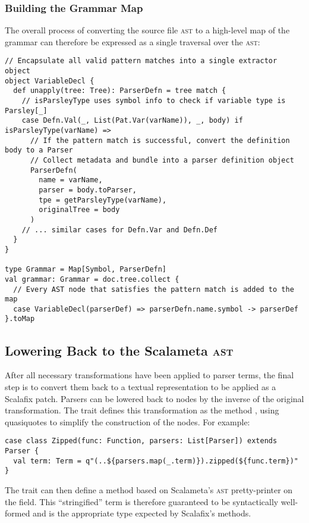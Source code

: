 \documentclass[../../main.tex]{subfiles}
\begin{document}
\subsubsection{Building the Grammar Map}
The overall process of converting the source file \textsc{ast} to a high-level map of the grammar can therefore be expressed as a single traversal over the \textsc{ast}:
\begin{verbatim}
// Encapsulate all valid pattern matches into a single extractor object
object VariableDecl {
  def unapply(tree: Tree): ParserDefn = tree match {
    // isParsleyType uses symbol info to check if variable type is Parsley[_]
    case Defn.Val(_, List(Pat.Var(varName)), _, body) if isParsleyType(varName) =>
      // If the pattern match is successful, convert the definition body to a Parser
      // Collect metadata and bundle into a parser definition object
      ParserDefn(
        name = varName,
        parser = body.toParser,
        tpe = getParsleyType(varName),
        originalTree = body
      )
    // ... similar cases for Defn.Var and Defn.Def
  }
}

type Grammar = Map[Symbol, ParserDefn]
val grammar: Grammar = doc.tree.collect {
  // Every AST node that satisfies the pattern match is added to the map
  case VariableDecl(parserDef) => parserDefn.name.symbol -> parserDef
}.toMap
\end{verbatim}

\subsection{Lowering Back to the Scalameta \textsc{ast}}\label{sec:lowering-parsers}
After all necessary transformations have been applied to parser terms, the final step is to convert them back to a textual representation to be applied as a Scalafix patch.
Parsers can be lowered back to  nodes by the inverse of the original  transformation.
The  trait defines this transformation as the method , using quasiquotes to simplify the construction of the  nodes.
For example:
\begin{verbatim}
case class Zipped(func: Function, parsers: List[Parser]) extends Parser {
  val term: Term = q"(..${parsers.map(_.term)}).zipped(${func.term})"
}
\end{verbatim}
%
The  trait can then define a  method based on Scalameta's \textsc{ast} pretty-printer on the  field.
This ``stringified'' term is therefore guaranteed to be syntactically well-formed and is the appropriate type expected by Scalafix's  methods.
\end{document}
